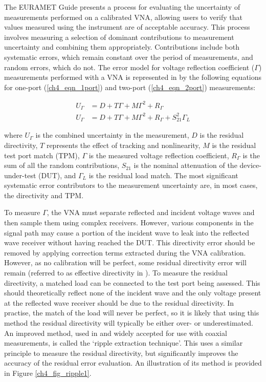 \documentclass[../thesis/thesis.tex]{subfiles}
\begin{document}
The EURAMET Guide \cite{EURAMET_2011} presents a process for evaluating the uncertainty of measurements performed on a calibrated VNA, allowing users to verify that values measured using the instrument are of acceptable accuracy. This process involves measuring a selection of dominant contributions to measurement uncertainty and combining them appropriately. Contributions include both systematic errors, which remain constant over the period of measurements, and random errors, which do not.  The error model for voltage reflection coefficient ($\Gamma$) measurements performed with a VNA is represented in \cite{EURAMET_2011} by the following equations for one-port (\ref{ch4_eqn_1port}) and two-port (\ref{ch4_eqn_2port}) measurements:

\begin{align}
U_{\Gamma} &= D + T\Gamma + M\Gamma^2 + R_{\Gamma} \label{ch4_eqn_1port} \\
U_{\Gamma} &= D + T\Gamma + M\Gamma^2 + R_{\Gamma} + S_{21}^2\Gamma_L \label{ch4_eqn_2port}
\end{align}

where $U_{\Gamma}$ is the combined uncertainty in the measurement, $D$ is the residual directivity, $T$ represents the effect of tracking and nonlinearity, $M$ is the residual test port match (TPM), $\Gamma$ is the measured voltage reflection coefficient, $R_{\Gamma}$ is the sum of all the random contributions, $S_{21}$ is the nominal attenuation of the device-under-test (DUT), and $\Gamma_L$ is the residual load match. The most significant systematic error contributors to the measurement uncertainty are, in most cases, the directivity and TPM.

To measure $\Gamma$, the VNA must separate reflected and incident voltage waves and then sample them using complex receivers. However, various components in the signal path may cause a portion of the incident wave to leak into the reflected wave receiver without having reached the DUT. This directivity error should be removed by applying correction terms extracted during the VNA calibration. However, as no calibration will be perfect, some residual directivity error will remain (referred to as effective directivity in \cite{EURAMET_2011}). To measure the residual directivity, a matched load can be connected to the test port being assessed. This should theoretically reflect none of the incident wave and the only voltage present at the reflected wave receiver should be due to the residual directivity. In practise, the match of the load will never be perfect, so it is likely that using this method the residual directivity will typically be either over- or underestimated. An improved method, used in \cite{EURAMET_2011} and widely accepted for use with coaxial measurements, is called the ‘ripple extraction technique’. This uses a similar principle to measure the residual directivity, but significantly improves the accuracy of the residual error evaluation. An illustration of its method is provided in Figure \ref{ch4_fig_ripple1}.
\end{document}
